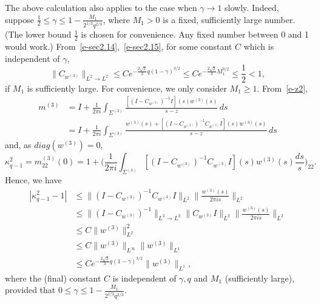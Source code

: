 \documentclass{amsart}
\theoremstyle{definition}
\theoremstyle{remark}
\numberwithin{equation}{section}
\begin{document}
\bigskip
The above calculation also applies to the case when $\gamma\to 1$ slowly.
Indeed, suppose $\frac12 \le \gamma \le 1-\frac{M_1}{2^{1/3}q^{2/3}}$, 
where $M_1>0$ is a fixed, sufficiently large number.
(The lower bound $\frac12$ is chosen for convenience. Any fixed number 
between 0 and 1 would work.) 
From~\eqref{e-sec2.14},~\eqref{e-sec2.15}, for some constant $C$
which is independent of $\gamma$,
\begin{equation}\label{e-sec3.6}
  \|C_{w^{(3)}}\|_{L^2\to L^2}
\le Ce^{-\frac{2\sqrt{2}}3q(1-\gamma)^{3/2}}
\le Ce^{-\frac{2\sqrt{2}}3M_1^{3/2}} \le \frac12 <1,
\end{equation}
if $M_1$ is sufficiently large. 
For convenience, we only consider $M_1\geq 1$.
From~\eqref{e-z2},
\begin{equation*}
  \begin{split}
    m^{(3)}&=I+\frac1{2\pi i} \int_{\Sigma^{(3)}} \frac{[(I-C_{w^{(3)}})^{-1
}I](s)w^{(3)}(s)}{s-z}\,ds\\
   &=I+\frac1{2\pi i} \int_{\Sigma^{(3)}} \frac{w^{(3)}(s)+[(I-C_{w^{(3)}})^
{-1}C_{w^{(3)}}I](s)w^{(3)}(s)}{s-z} \,ds
  \end{split}
\end{equation*}
and, as $diag(w^{(3)})=0$,
\begin{equation}
   \kappa^2_{q-1}=m^{(3)}_{22}(0)
    =1+\bigl( \frac1{2\pi i} \int_{\Sigma^{(3)}}
[(I-C_{w^{(3)}})^{-1}C_{w^{(3)}}I](s)w^{(3)}(s)
    \frac{ds}{s} \bigr)_{22}.
\end{equation}
Hence, we have
\begin{equation}
  \begin{split}
    |\kappa^2_{q-1}-1|&\le
\|(I-C_{w^{(3)}})^{-1}C_{w^{(3)}}I\|_{L^2}
\|\frac{w^{(3)}(s)}{2\pi is}\|_{L^2}\\
    &\le \|(I-C_{w^{(3)}})^{-1}\|_{L^2\rightarrow L^2}
\|C_{w^{(3)}}I\|_{L^2} \|\frac{w^{(3)}(s)}{2\pi is}\|_{L^2}\\
    &\le C\|w^{(3)}\|_{L^2}^2\\
    &\le C\|w^{(3)}\|_{L^\infty} \|w^{(3)}\|_{L^1}\\
    &\le Ce^{-\frac{2\sqrt{2}}3q(1-\gamma)^{3/2}} \|w^{(3)}\|_{L^1},
  \end{split}
\end{equation}
where the (final) constant $C$ is independent of $\gamma,q$ and $M_1$ 
(sufficiently large), provided that 
$0\le\gamma\le 1-\frac{M_1}{2^{1/3}q^{2/3}}$.
\end{document}
